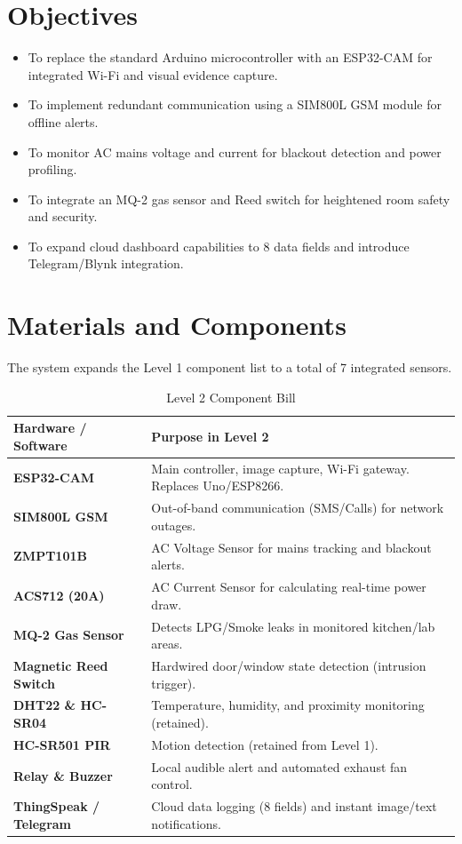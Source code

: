 \documentclass[12pt,a4paper]{article}
\begin{document}
\section{Objectives}
\begin{itemize}
    \item To replace the standard Arduino microcontroller with an ESP32-CAM for integrated Wi-Fi and visual evidence capture.
    \item To implement redundant communication using a SIM800L GSM module for offline alerts.
    \item To monitor AC mains voltage and current for blackout detection and power profiling.
    \item To integrate an MQ-2 gas sensor and Reed switch for heightened room safety and security.
    \item To expand cloud dashboard capabilities to 8 data fields and introduce Telegram/Blynk integration.
\end{itemize}

\section{Materials and Components}
The system expands the Level 1 component list to a total of 7 integrated sensors.

\begin{table}[H]
\centering
\begin{tabular}{|p{4.5cm}|p{10cm}|}
\hline
\textbf{Hardware / Software} & \textbf{Purpose in Level 2} \\ \hline
\textbf{ESP32-CAM} & Main controller, image capture, Wi-Fi gateway. Replaces Uno/ESP8266. \\ \hline
\textbf{SIM800L GSM} & Out-of-band communication (SMS/Calls) for network outages. \\ \hline
\textbf{ZMPT101B} & AC Voltage Sensor for mains tracking and blackout alerts. \\ \hline
\textbf{ACS712 (20A)} & AC Current Sensor for calculating real-time power draw. \\ \hline
\textbf{MQ-2 Gas Sensor} & Detects LPG/Smoke leaks in monitored kitchen/lab areas. \\ \hline
\textbf{Magnetic Reed Switch} & Hardwired door/window state detection (intrusion trigger). \\ \hline
\textbf{DHT22 \& HC-SR04} & Temperature, humidity, and proximity monitoring (retained). \\ \hline
\textbf{HC-SR501 PIR} & Motion detection (retained from Level 1). \\ \hline
\textbf{Relay \& Buzzer} & Local audible alert and automated exhaust fan control. \\ \hline
\textbf{ThingSpeak / Telegram} & Cloud data logging (8 fields) and instant image/text notifications. \\ \hline
\end{tabular}
\caption{Level 2 Component Bill}
\end{table}
\end{document}
